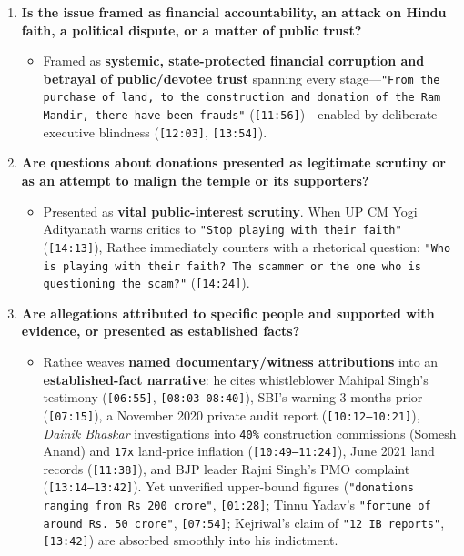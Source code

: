 \documentclass[10pt,a4paper]{article}
\begin{document}
\begin{enumerate}[leftmargin=1.6em, itemsep=4pt, topsep=4pt]
\begin{itemize}[leftmargin=1.4em, itemsep=2pt, topsep=2pt]
    \item \textbf{People Making Allegations:} Whistleblower account-in-charge Mahipal Singh (\texttt{[06:55]}, \texttt{[08:03--08:31]}), SP chief Akhilesh Yadav (\texttt{[08:50]}), Shiv Sena's Sanjay Raut (\texttt{[09:18]}), Mumbai businessman Anil Vishwakarma (\texttt{[09:27]}), BJP politician Rajni Singh (\texttt{[13:14--13:24]}), and AAP's Arvind Kejriwal (\texttt{[13:42]}) are all treated as credible corroborating witnesses.
  \end{itemize}
  \item \textbf{Is the issue framed as financial accountability, an attack on Hindu faith, a political dispute, or a matter of public trust?}
  \begin{itemize}[leftmargin=1.4em, itemsep=2pt, topsep=2pt]
    \item Framed as \textbf{systemic, state-protected financial corruption and betrayal of public/devotee trust} spanning every stage---\texttt{"From the purchase of land, to the construction and donation of the Ram Mandir, there have been frauds"} (\texttt{[11:56]})---enabled by deliberate executive blindness (\texttt{[12:03]}, \texttt{[13:54]}).
  \end{itemize}
  \item \textbf{Are questions about donations presented as legitimate scrutiny or as an attempt to malign the temple or its supporters?}
  \begin{itemize}[leftmargin=1.4em, itemsep=2pt, topsep=2pt]
    \item Presented as \textbf{vital public-interest scrutiny}. When UP CM Yogi Adityanath warns critics to \texttt{"Stop playing with their faith"} (\texttt{[14:13]}), Rathee immediately counters with a rhetorical question: \texttt{"Who is playing with their faith? The scammer or the one who is questioning the scam?"} (\texttt{[14:24]}).
  \end{itemize}
  \item \textbf{Are allegations attributed to specific people and supported with evidence, or presented as established facts?}
  \begin{itemize}[leftmargin=1.4em, itemsep=2pt, topsep=2pt]
    \item Rathee weaves \textbf{named documentary/witness attributions} into an \textbf{established-fact narrative}: he cites whistleblower Mahipal Singh's testimony (\texttt{[06:55]}, \texttt{[08:03--08:40]}), SBI's warning 3 months prior (\texttt{[07:15]}), a November 2020 private audit report (\texttt{[10:12--10:21]}), \textit{Dainik Bhaskar} investigations into \texttt{40\%} construction commissions (Somesh Anand) and \texttt{17x} land-price inflation (\texttt{[10:49--11:24]}), June 2021 land records (\texttt{[11:38]}), and BJP leader Rajni Singh's PMO complaint (\texttt{[13:14--13:42]}). Yet unverified upper-bound figures (\texttt{"donations ranging from Rs 200 crore"}, \texttt{[01:28]}; Tinnu Yadav's \texttt{"fortune of around Rs.\,50 crore"}, \texttt{[07:54]}; Kejriwal's claim of \texttt{"12 IB reports"}, \texttt{[13:42]}) are absorbed smoothly into his indictment.

\end{itemize}
\end{enumerate}
\end{document}
